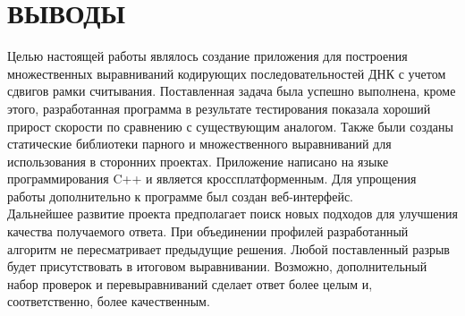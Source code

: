 \newpage
\part*{\large \centering ВЫВОДЫ}
\hspace{\parindent} Целью настоящей работы являлось создание приложения для построения множественных выравниваний кодирующих последовательностей ДНК с учетом сдвигов рамки считывания. Поставленная задача была успешно выполнена, кроме этого, разработанная программа в результате тестирования показала хороший прирост скорости по сравнению с существующим аналогом. Также были созданы статические библиотеки парного и множественного выравниваний для использования в сторонних проектах. Приложение написано на языке программирования C++ и является кроссплатформенным. Для упрощения работы дополнительно к программе был создан веб-интерфейс.\\
\indent Дальнейшее развитие проекта предполагает поиск новых подходов для улучшения качества получаемого ответа. При объединении профилей разработанный алгоритм не пересматривает предыдущие решения. Любой поставленный разрыв будет присутствовать в итоговом выравнивании. Возможно, дополнительный набор проверок и перевыравниваний сделает ответ более целым и, соответственно, более качественным.
